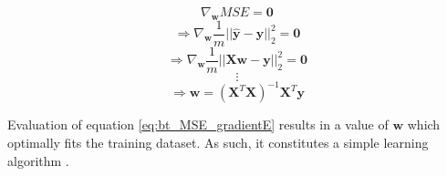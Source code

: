 \begin{equation}
    \label{eq:bt_MSE_gradientB}
    \nabla_{\bm{w}}MSE=\bm{0}
\end{equation}
\begin{equation}
    \Rightarrow \nabla_{\bm{w}}\frac{1}{m}||\hat{\bm{y}}-\bm{y}||^2_2=\bm{0}
\end{equation}
\begin{equation}
    \Rightarrow \nabla_{\bm{w}}\frac{1}{m}||\bm{X}\bm{w}-\bm{y}||^2_2=\bm{0}
\end{equation}
\begin{equation*}
    \vdots
\end{equation*}
\begin{equation}
    \label{eq:bt_MSE_gradientE}
    \Rightarrow \bm{w}=(\bm{X}^T\bm{X})^{-1}\bm{X}^T\bm{y}
\end{equation}

Evaluation of equation \ref{eq:bt_MSE_gradientE} results in a value of $\bm{w}$ which optimally fits the training dataset. As such, it constitutes a simple learning algorithm \cite{goodfellow2016}.





